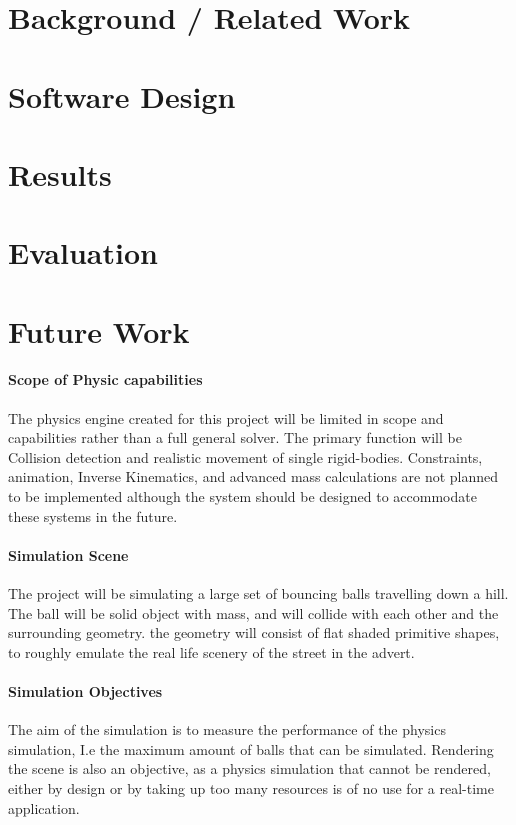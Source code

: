 \documentclass[conference]{acmsiggraph}
\begin{document}
\section{Background / Related Work}

\section{Software Design}

\section{Results}

\section{Evaluation}

\section{Future Work}

\paragraph{Scope of Physic capabilities}
The physics engine created for this project will be limited in scope and capabilities rather than a full general solver. The primary function will be Collision detection and realistic movement of single rigid-bodies. Constraints, animation, Inverse Kinematics, and advanced mass calculations are not planned to be implemented although the system should be designed to accommodate these systems in the future.

\paragraph{Simulation Scene}
The project will be simulating a large set of bouncing balls travelling down a hill. The ball will be solid object with mass, and will collide with each other and the surrounding geometry. the geometry will consist of flat shaded primitive shapes, to roughly emulate the real life scenery of the street in the advert.

\paragraph{Simulation Objectives}
The aim of the simulation is to measure the performance of the physics simulation, I.e the maximum amount of balls that can be simulated. Rendering the scene is also an objective, as a physics simulation that cannot be rendered, either by design or by taking up too many resources is of no use for a real-time application.
\end{document}
